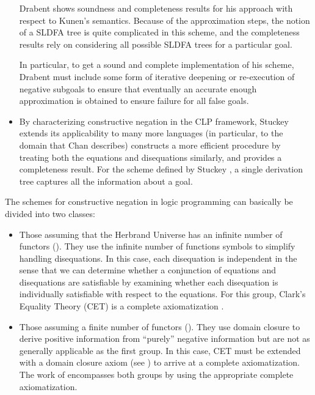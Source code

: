 \documentclass{tlp}
\begin{document}
\begin{itemize}
Drabent shows soundness and completeness results for his approach with
respect to Kunen's semantics. Because of the approximation steps, the
notion of a SLDFA tree is quite complicated in this scheme, and
the completeness results rely on considering all possible SLDFA trees
for a particular goal. 

In particular, to get a sound and complete
implementation of his scheme, Drabent must include some form of
iterative deepening or re-execution of negative subgoals to ensure
that eventually an accurate enough approximation is obtained to
ensure failure for all false goals.

\item By characterizing constructive negation in the CLP framework,
Stuckey \cite{Stuckey95} extends its applicability to many more
languages (in particular, to the domain that Chan describes)
constructs a more efficient procedure by treating both the equations
and disequations similarly, and provides a completeness result. For
the scheme defined by Stuckey \cite{Stuckey95}, a single derivation
tree captures all the information about a goal.

\end{itemize}

The schemes for constructive negation in logic programming can
basically be divided into two classes:

\begin{itemize}

\item Those assuming that the Herbrand Universe has an infinite number
of functors (\cite{Chan1,Wallace,Sato91}). They use the infinite
number of functions symbols to simplify handling disequations. In this
case, each disequation is independent in the sense that we can
determine whether a conjunction of equations and disequations are
satisfiable by examining whether each disequation is individually
satisfiable with respect to the equations. For this group, Clark's
Equality Theory (CET) \cite{Clark} is a complete axiomatization
\cite{Maher}.

\item Those assuming a finite number of functors (\cite{Malus,Foo}).
They use domain closure to derive positive information from
``purely'' negative information but are not as generally applicable as
the first group. In this case, CET must be extended with a domain
closure axiom (see \cite{Maher}) to arrive at a complete
axiomatization. The work of \cite{Drabent} encompasses both groups by
using the appropriate complete axiomatization.
\end{itemize}
\end{document}
